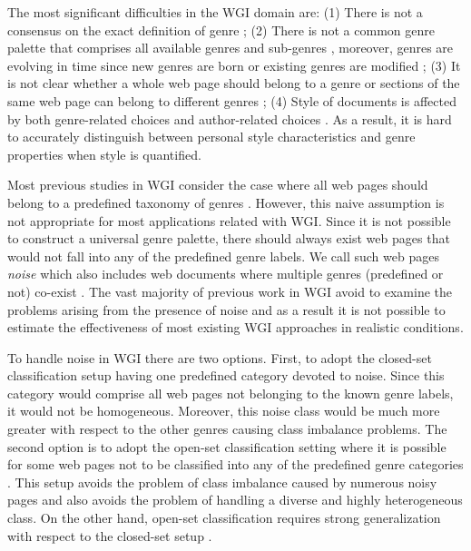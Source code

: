 \documentclass[
    11pt, %
    english, %
    singlespacing, %
    headsepline, %
]{DoctoralThesis} %
\begin{document}
The most significant difficulties in the WGI domain are: (1) There is not a consensus on the exact definition of genre \parencite{crowston2011problems}; (2) There is not a common genre palette that comprises all available genres and sub-genres \parencite{santini2011cross,mehler2010genres_on_web,mason2009n,sharoff2010web}, moreover, genres are evolving in time since new genres are born or existing genres are modified \parencite{Boese2005}; (3) It is not clear whether a whole web page should belong to a genre or sections of the same web page can belong to different genres \parencite{jebari2015combination,madjarov2015web}; (4) Style of documents is affected by both genre-related choices and author-related choices \parencite{petrenz2011stable,Sharroff2010}. As a result, it is hard to accurately distinguish between personal style characteristics and genre properties when style is quantified.

Most previous studies in WGI consider the case where all web pages should belong to a predefined taxonomy of genres \parencite{Lim2005,santini2007automatic,kanaris2009learning,jebari2014pure_URL}. However, this naive assumption is not appropriate for most applications related with WGI. Since it is not possible to construct a universal genre palette, there should always exist web pages that would not fall into any of the predefined genre labels. We call such web pages \textit{noise} which also includes web documents where multiple genres (predefined or not) co-exist \parencite{santini2011cross,levering2008using}. The vast majority of previous work in WGI avoid to examine the problems arising from the presence of noise and as a result it is not possible to estimate the effectiveness of most existing WGI approaches in realistic conditions.

To handle noise in WGI there are two options. First, to adopt the closed-set classification setup having one predefined category devoted to noise. Since this category would comprise all web pages not belonging to the known genre labels, it would not be homogeneous. Moreover, this noise class would be much more greater with respect to the other genres causing class imbalance problems. The second option is to adopt the open-set classification setting where it is possible for some web pages not to be classified into any of the predefined genre categories \parencite{pritsos2013open}. This setup avoids the problem of class imbalance caused by numerous noisy pages and also avoids the problem of handling a diverse and highly heterogeneous class. On the other hand, open-set classification requires strong generalization with respect to the closed-set setup \parencite{scheirer2013toward}.
\end{document}
